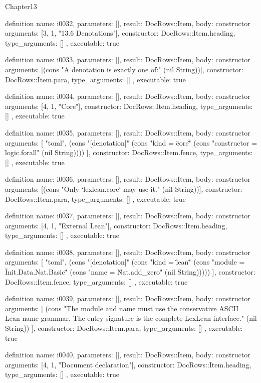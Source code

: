 \begin{lexlean}{Chapter13}
\begin{semanticmodule}
definition{
  name: i0032,
  parameters: [],
  result: DocRows::Item,
  body: constructor{
    arguments: [3, 1, "13.6 Denotations"],
    constructor: DocRows::Item.heading,
    type_arguments: []
  },
  executable: true
}

definition{
  name: i0033,
  parameters: [],
  result: DocRows::Item,
  body: constructor{
    arguments: [(cons "A denotation is exactly one of:" (nil String))],
    constructor: DocRows::Item.para,
    type_arguments: []
  },
  executable: true
}

definition{
  name: i0034,
  parameters: [],
  result: DocRows::Item,
  body: constructor{
    arguments: [4, 1, "Core"],
    constructor: DocRows::Item.heading,
    type_arguments: []
  },
  executable: true
}

definition{
  name: i0035,
  parameters: [],
  result: DocRows::Item,
  body: constructor{
    arguments: [
      "toml",
      (cons "[denotation]" (cons "kind = \"core\"" (cons "constructor = \"logic.forall\"" (nil String))))
    ],
    constructor: DocRows::Item.fence,
    type_arguments: []
  },
  executable: true
}

definition{
  name: i0036,
  parameters: [],
  result: DocRows::Item,
  body: constructor{
    arguments: [(cons "Only `lexlean.core` may use it." (nil String))],
    constructor: DocRows::Item.para,
    type_arguments: []
  },
  executable: true
}

definition{
  name: i0037,
  parameters: [],
  result: DocRows::Item,
  body: constructor{
    arguments: [4, 1, "External Lean"],
    constructor: DocRows::Item.heading,
    type_arguments: []
  },
  executable: true
}

definition{
  name: i0038,
  parameters: [],
  result: DocRows::Item,
  body: constructor{
    arguments: [
      "toml",
      (cons "[denotation]" (cons "kind = \"lean\"" (cons "module = \"Init.Data.Nat.Basic\"" (cons "name = \"Nat.add_zero\"" (nil String)))))
    ],
    constructor: DocRows::Item.fence,
    type_arguments: []
  },
  executable: true
}

definition{
  name: i0039,
  parameters: [],
  result: DocRows::Item,
  body: constructor{
    arguments: [
      (cons "The module and name must use the conservative ASCII Lean-name grammar. The entry signature is the complete LexLean interface." (nil String))
    ],
    constructor: DocRows::Item.para,
    type_arguments: []
  },
  executable: true
}

definition{
  name: i0040,
  parameters: [],
  result: DocRows::Item,
  body: constructor{
    arguments: [4, 1, "Document declaration"],
    constructor: DocRows::Item.heading,
    type_arguments: []
  },
  executable: true
}


\end{semanticmodule}
\end{lexlean}
